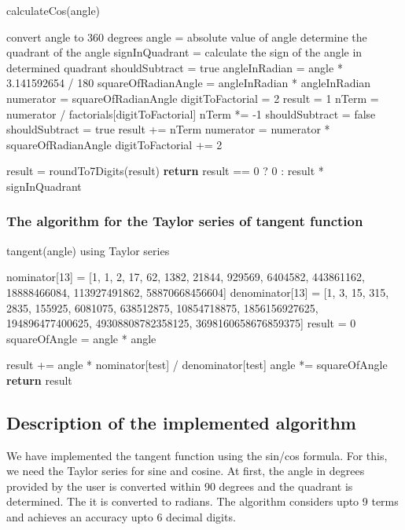 \documentclass[12pt]{article}
\begin{document}
\begin{algorithm}[H]
	\caption{calculateCos(angle)} 
	\begin{algorithmic}[1]
        \State convert angle to 360 degrees
            \State angle = absolute value of angle
        \EndIf
        \State determine the quadrant of the angle
		\State signInQuadrant = calculate the sign of the angle in determined quadrant
        \State shouldSubtract = true
        \State angleInRadian = angle * 3.141592654 / 180
        \State squareOfRadianAngle = angleInRadian * angleInRadian
        \State numerator = squareOfRadianAngle
        \State digitToFactorial = 2
        \State result = 1
            \State nTerm = numerator / factorials[digitToFactorial]
                \State nTerm *= -1
                \State shouldSubtract = false
            \State \Else
                \State shouldSubtract = true
            \EndIf
            \State result += nTerm
            \State numerator = numerator * squareOfRadianAngle
            \State digitToFactorial += 2
        \EndFor

        \State result = roundTo7Digits(result)
        \State \textbf{return} result == 0 ? 0 : result * signInQuadrant
	\end{algorithmic} 
\end{algorithm}

\subsubsection{The algorithm for the Taylor series of tangent function}
\begin{algorithm}[H]
	\caption{tangent(angle) using Taylor series} 
	\begin{algorithmic}[1]
        \State nominator[13] = [1, 1, 2, 17, 62, 1382, 21844, 929569, 6404582, 443861162, 18888466084, 113927491862, 58870668456604]
        \State denominator[13] = [1, 3, 15, 315, 2835, 155925, 6081075, 638512875, 10854718875, 1856156927625, 194896477400625, 49308808782358125, 3698160658676859375]
    \State result = 0
    \State squareOfAngle = angle * angle

        \State result += angle * nominator[test] / denominator[test]
        \State angle *= squareOfAngle
    \EndFor
    \State \textbf{return} result
	\end{algorithmic} 
\end{algorithm}
\subsection{Description of the implemented algorithm}
We have implemented the tangent function using the sin/cos formula. For this, we need the Taylor series for sine and cosine. At first, the angle in degrees provided by the user is converted within 90 degrees and the quadrant is determined. The it is converted to radians. The algorithm considers upto 9 terms and achieves an accuracy upto 6 decimal digits.
\end{document}
